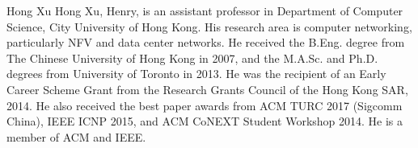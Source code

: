 \documentclass[10pt,journal,compsoc]{IEEEtran}
\begin{document}
\begin{IEEEbiography}
{Hong Xu}
Hong Xu, Henry, is an assistant professor in Department of Computer Science, City University of Hong Kong. His research area is computer networking, particularly NFV and data center networks. He received the B.Eng. degree from The Chinese University of Hong Kong in 2007, and the M.A.Sc. and Ph.D. degrees from University of Toronto in 2013. He was the recipient of an Early Career Scheme Grant from the Research Grants Council of the Hong Kong SAR, 2014. He also received the best paper awards from ACM TURC 2017 (Sigcomm China), IEEE ICNP 2015, and ACM CoNEXT Student Workshop 2014. He is a member of ACM and IEEE.
\end{IEEEbiography}






\end{document}
